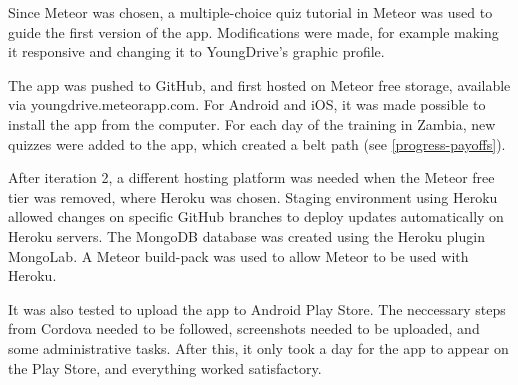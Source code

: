 
Since Meteor was chosen, a multiple-choice quiz tutorial in Meteor was used to guide the first version of the app. Modifications were made, for example making it responsive and changing it to YoungDrive's graphic profile.

The app was pushed to GitHub, and first hosted on Meteor free storage, available via youngdrive.meteorapp.com. For Android and iOS, it was made possible to install the app from the computer.  For each day of the training in Zambia, new quizzes were added to the app, which created a belt path (see \ref{progress-payoffs}).

After iteration 2, a different hosting platform was needed when the Meteor free tier was removed, where Heroku was chosen. Staging environment using Heroku allowed changes on specific GitHub branches to deploy updates automatically on Heroku servers. The MongoDB database was created using the Heroku plugin MongoLab. A Meteor build-pack was used to allow Meteor to be used with Heroku.

It was also tested to upload the app to Android Play Store. The neccessary steps from Cordova needed to be followed, screenshots needed to be uploaded, and some administrative tasks. After this, it only took a day for the app to appear on the Play Store, and everything worked satisfactory.
